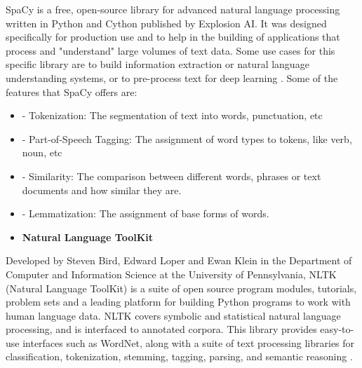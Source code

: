         
        \par SpaCy is a free, open-source library for advanced natural language processing written in Python and Cython published by Explosion AI. It was designed specifically for production use and to help in the building of applications that process and "understand" large volumes of text data.  Some use cases for this specific library are to build information extraction or natural language understanding systems, or to pre-process text for deep learning \cite{Spacy2017}. Some of the features that SpaCy offers are: 

        
        \begin{itemize}[leftmargin=1cm]  
            \renewcommand{\labelitemi}{$\textperiodcentered$}
        
            \item - Tokenization: The segmentation of text into words, punctuation, etc
            \item - Part-of-Speech Tagging: The assignment of word types to tokens, like verb, noun, etc
            \item - Similarity: The comparison between different words, phrases or text documents and how similar they are.
            \item - Lemmatization: The assignment of base forms of words.
   
            \renewcommand{\labelitemi}{$\textbullet$}
        \end{itemize}
        
        \newpage
        
        \begin{itemize}
            \item\textbf{Natural Language ToolKit}
        \end{itemize}
      
 

        \par Developed by Steven Bird, Edward Loper and Ewan Klein in the Department of Computer and Information Science at the University of Pennsylvania, NLTK (Natural Language ToolKit) is a suite of open source program modules, tutorials, problem sets and a leading platform for building Python programs to work with human language data. NLTK covers symbolic and statistical natural language processing, and is interfaced to annotated corpora. This library provides easy-to-use interfaces such as WordNet, along with a suite of text processing libraries for classification, tokenization, stemming, tagging, parsing, and semantic reasoning \cite{Loper2002}. 

